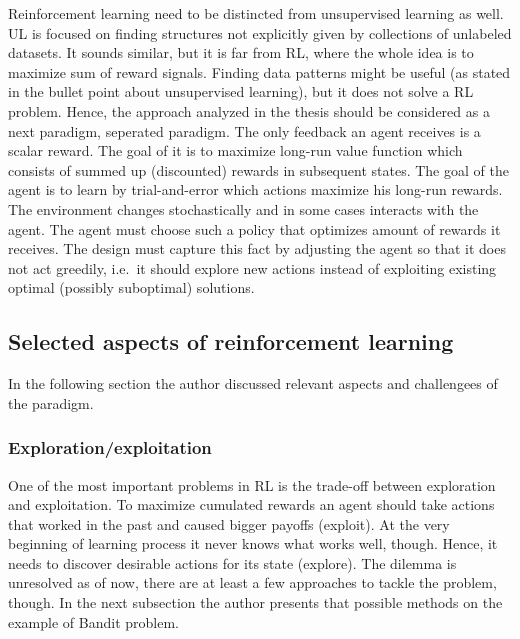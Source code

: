 \documentclass[]{article}
\begin{document}
\begin{itemize}
  Reinforcement learning need to be distincted from unsupervised
  learning as well. UL is focused on finding structures not explicitly
  given by collections of unlabeled datasets. It sounds similar, but it
  is far from RL, where the whole idea is to maximize sum of reward
  signals. Finding data patterns might be useful (as stated in the
  bullet point about unsupervised learning), but it does not solve a RL
  problem. Hence, the approach analyzed in the thesis should be
  considered as a next paradigm, seperated paradigm. The only feedback
  an agent receives is a scalar reward. The goal of it is to maximize
  long-run value function which consists of summed up (discounted)
  rewards in subsequent states. The goal of the agent is to learn by
  trial-and-error which actions maximize his long-run rewards. The
  environment changes stochastically and in some cases interacts with
  the agent. The agent must choose such a policy that optimizes amount
  of rewards it receives. The design must capture this fact by adjusting
  the agent so that it does not act greedily, i.e.~it should explore new
  actions instead of exploiting existing optimal (possibly suboptimal)
  solutions.
\end{itemize}

\subsection{Selected aspects of reinforcement
learning}\label{selected-aspects-of-reinforcement-learning}

In the following section the author discussed relevant aspects and
challengees of the paradigm.

\subsubsection{Exploration/exploitation}\label{explorationexploitation}

One of the most important problems in RL is the trade-off between
exploration and exploitation. To maximize cumulated rewards an agent
should take actions that worked in the past and caused bigger payoffs
(exploit). At the very beginning of learning process it never knows what
works well, though. Hence, it needs to discover desirable actions for
its state (explore). The dilemma is unresolved as of now, there are at
least a few approaches to tackle the problem, though. In the next
subsection the author presents that possible methods on the example of
Bandit problem.
\end{document}
